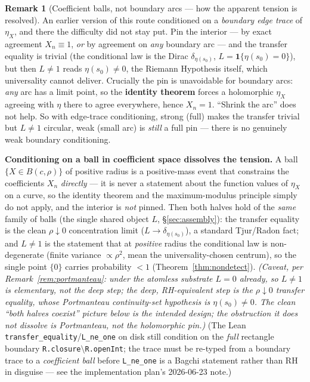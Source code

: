 \documentclass[11pt,a4paper]{article}
\theoremstyle{definition}
\newtheorem{remark}[theorem]{Remark}
\newcommand{\etaX}{\eta_X}
\begin{document}
\begin{remark}[Coefficient balls, not boundary arcs --- how the apparent tension is resolved]\label{rem:tradeoff}
An earlier version of this route conditioned on a \emph{boundary edge trace} of \(\etaX\), and there
the difficulty did not stay put. Pin the interior --- by exact agreement \(X_n\equiv1\), \emph{or} by
agreement on \emph{any} boundary arc --- and the transfer equality is trivial (the conditional law is
the Dirac \(\delta_{\eta(s_0)}\), \(L=\mathbf{1}\{\eta(s_0)=0\}\)), but then \(L\neq1\) reads
\(\eta(s_0)\neq0\), the Riemann Hypothesis itself, which universality cannot deliver. Crucially the
pin is unavoidable for boundary arcs: \emph{any} arc has a limit point, so the \textbf{identity
theorem} forces a holomorphic \(\etaX\) agreeing with \(\eta\) there to agree everywhere, hence
\(X_n=1\). ``Shrink the arc'' does not help. So with edge-trace conditioning, strong (full) makes the
transfer trivial but \(L\neq1\) circular, weak (small arc) is \emph{still} a full pin --- there is no
genuinely weak boundary conditioning.

\textbf{Conditioning on a ball in coefficient space dissolves the tension.} A ball
\(\{X\in B(c,\rho)\}\) of positive radius is a positive-mass event that constrains the coefficients
\(X_n\) \emph{directly} --- it is never a statement about the function values of \(\etaX\) on a curve,
so the identity theorem and the maximum-modulus principle simply do not apply, and the interior is
\emph{not} pinned. Then both halves hold of the \emph{same} family of balls (the single shared object
\(L\), \S\ref{sec:assembly}): the transfer equality is the clean \(\rho\downarrow0\) concentration
limit (\(L\to\delta_{\eta(s_0)}\)), a standard Tjur/Radon fact; and \(L\neq1\) is the statement that at
\emph{positive} radius the conditional law is non-degenerate (finite variance \(\propto\rho^2\), mean
the universality-chosen centrum), so the single point \(\{0\}\) carries probability \(<1\)
(Theorem~\ref{thm:nondetect}). \emph{(Caveat, per Remark~\ref{rem:portmanteau}: under the atomless
substrate \(L=0\) already, so \(L\neq1\) is elementary, not the deep step; the deep, RH-equivalent
step is the \(\rho\downarrow0\) transfer equality, whose Portmanteau continuity-set hypothesis is
\(\eta(s_0)\neq0\). The clean ``both halves coexist'' picture below is the \emph{intended} design; the
obstruction it does not dissolve is Portmanteau, not the holomorphic pin.)} (The Lean
\texttt{transfer\_equality}/\texttt{L\_ne\_one} on disk still condition on the \emph{full} rectangle
boundary \texttt{R.closure}\(\setminus\)\texttt{R.openInt}; the trace must be re-typed from a boundary
trace to a \emph{coefficient ball} before \texttt{L\_ne\_one} is a Bagchi statement rather than RH in
disguise --- see the implementation plan's 2026-06-23 note.)
\end{remark}
\end{document}
